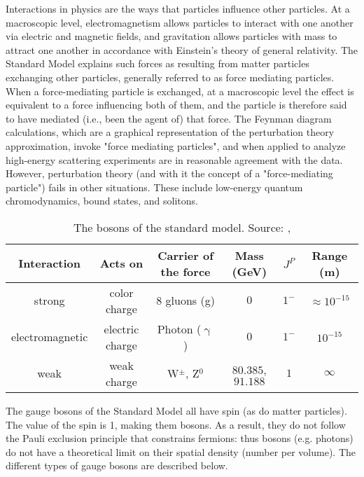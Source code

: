 Interactions in physics are the ways that particles influence other particles. At a macroscopic level, electromagnetism allows particles to interact with one another via electric and magnetic fields, and gravitation allows particles with mass to attract one another in accordance with Einstein's theory of general relativity. The Standard Model explains such forces as resulting from matter particles exchanging other particles, generally referred to as force mediating particles. When a force-mediating particle is exchanged, at a macroscopic level the effect is equivalent to a force influencing both of them, and the particle is therefore said to have mediated (i.e., been the agent of) that force. The Feynman diagram calculations, which are a graphical representation of the perturbation theory approximation, invoke "force mediating particles", and when applied to analyze high-energy scattering experiments are in reasonable agreement with the data. However, perturbation theory (and with it the concept of a "force-mediating particle") fails in other situations. These include low-energy quantum chromodynamics, bound states, and solitons.
\begin{table}[h]
	\caption[Bosons described by the SM]{The bosons of the standard model. Source: \cite{povh}, \cite{faltermann}}
	\label{tab:ch_1_sm_bosons}
	\begin{tabular}{cccccc}
		\toprule
		Interaction & Acts on & Carrier of the force & Mass (GeV) & {$J^P$} & Range (m)\\
		\midrule
		strong & color charge & 8 gluons (g) & {$0$} & {$1^-$} & $\approx 10^{-15}$\\
		electromagnetic & electric charge & Photon ($\upgamma$) & {$0$} & {$1^-$} & $10^{-15}$\\
		weak & weak charge & W$^{\pm}$, Z$^0$ & {$80.385$, $91.188$} & {$1$} & $\infty$\\
		\bottomrule
	\end{tabular}
\end{table}
The gauge bosons of the Standard Model all have spin (as do matter particles). The value of the spin is 1, making them bosons. As a result, they do not follow the Pauli exclusion principle that constrains fermions: thus bosons (e.g. photons) do not have a theoretical limit on their spatial density (number per volume). The different types of gauge bosons are described below.

